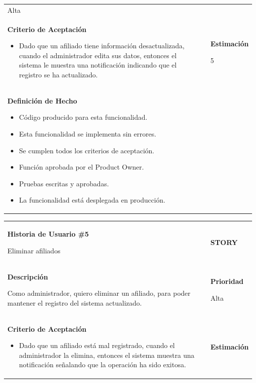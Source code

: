 \documentclass[12pt,a4paper]{article}
\begin{document}
\begin{center}
\begin{tabular}{| p{10cm} c p{2.5cm}|}
Alta\\

\textbf{Criterio de Aceptación}

\begin{itemize}
\item Dado que un afiliado tiene información desactualizada, cuando el
administrador edita sus datos, entonces el sistema le muestra
una notificación indicando que el registro se ha actualizado.
\end{itemize} & & \textbf{Estimación}

5 \\ 

\textbf{Definición de Hecho}

\begin{itemize}
\item Código producido para esta funcionalidad.
\item Esta funcionalidad se implementa sin errores.
\item Se cumplen todos los criterios de aceptación.
\item Función aprobada por el Product Owner.
\item Pruebas escritas y aprobadas.
\item La funcionalidad está desplegada en producción.
\end{itemize} & & \\
\hline  
\end{tabular}
\vspace{5mm}

\begin{tabular}{| p{10cm} c p{2.5cm}|}
\hline 
\textbf{Historia de Usuario \#5}

Eliminar afiliados & & \textbf{{\Large STORY}} \\ 
\textbf{Descripción}

Como administrador, quiero eliminar un afiliado, para poder mantener el registro del
sistema actualizado. &  & \textbf{Prioridad}

Alta\\

\textbf{Criterio de Aceptación}

\begin{itemize}
\item Dado que un afiliado está mal registrado, cuando el
administrador la elimina, entonces el sistema muestra una notificación señalando que la
operación ha sido exitosa.
\end{itemize} & & \textbf{Estimación}


\end{tabular}
\end{center}
\end{document}
